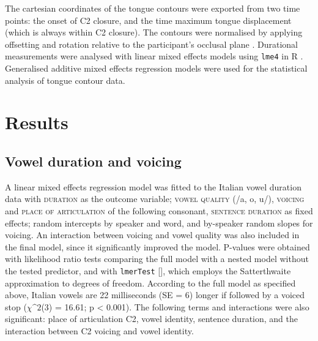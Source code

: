 \documentclass[authoryear, twocolumn]{elsarticle}
\begin{document}
The cartesian coordinates of the tongue contours were exported from two
time points: the onset of C2 closure, and the time maximum tongue
displacement (which is always within C2 closure). The contours were
normalised by applying offsetting and rotation relative to the
participant's occlusal plane \citep{scobbie2011}. Durational
measurements were analysed with linear mixed effects models using
\texttt{lme4} in R \citep{r-core-team2017, bates2015}. Generalised
additive mixed effects regression models \citep[GAMMs,][]{wood2006} were
used for the statistical analysis of tongue contour data.

\section{Results}\label{results}

\subsection{Vowel duration and
voicing}\label{vowel-duration-and-voicing}

A linear mixed effects regression model was fitted to the Italian vowel
duration data with \textsc{duration} as the outcome variable;
\textsc{vowel quality} (/a, o, u/), \textsc{voicing} and
\textsc{place of articulation} of the following consonant,
\textsc{sentence duration} as fixed effects; random intercepts by
speaker and word, and by-speaker random slopes for voicing. An
interaction between voicing and vowel quality was also included in the
final model, since it significantly improved the model. P-values were
obtained with likelihood ratio tests comparing the full model with a
nested model without the tested predictor, and with \texttt{lmerTest}
{[}{]}, which employs the Satterthwaite approximation to degrees of
freedom. According to the full model as specified above, Italian vowels
are 22 milliseconds (SE = 6) longer if followed by a voiced stop
(\(\chi\^2\)(3) = 16.61; p \textless{} 0.001). The following terms and
interactions were also significant: place of articulation C2, vowel
identity, sentence duration, and the interaction between C2 voicing and
vowel identity.
\end{document}
